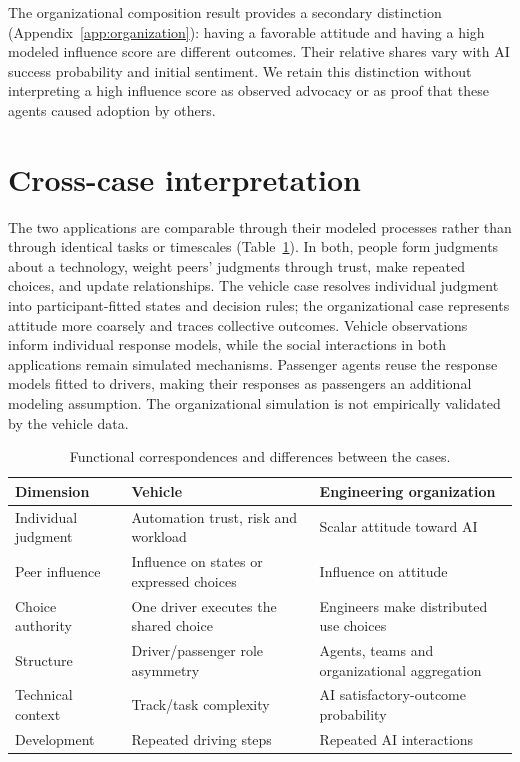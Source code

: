 \documentclass[11pt]{article}
\begin{document}
The organizational composition result provides a secondary distinction
(Appendix~\ref{app:organization}): having a favorable attitude and having a
high modeled influence score are different outcomes. Their relative shares
vary with AI success probability and initial sentiment. We retain this
distinction without interpreting a high influence score as observed advocacy
or as proof that these agents caused adoption by others.
\FloatBarrier

\section{Cross-case interpretation}
\label{sec:interpretation}

The two applications are comparable through their modeled processes rather
than through identical tasks or timescales (Table~\ref{tab:comparison}). In
both, people form judgments about a technology, weight peers' judgments through
trust, make repeated choices, and update relationships. The vehicle case
resolves individual judgment into participant-fitted states and decision
rules; the organizational case represents attitude more coarsely and traces
collective outcomes. Vehicle observations inform individual response models,
while the social interactions in both applications remain simulated mechanisms.
Passenger agents reuse the response models fitted to drivers, making their
responses as passengers an additional modeling assumption.
The organizational simulation is not empirically validated by the vehicle data.

\begin{table}[htbp]
  \centering
  \small
  \caption{Functional correspondences and differences between the cases.}
  \label{tab:comparison}
  \begin{tabularx}{\linewidth}{@{}lXX@{}}
    \toprule
    Dimension & Vehicle & Engineering organization \\
    \midrule
    Individual judgment & Automation trust, risk and workload & Scalar attitude toward AI \\
    Peer influence & Influence on states or expressed choices & Influence on attitude \\
    Choice authority & One driver executes the shared choice & Engineers make distributed use choices \\
    Structure & Driver/passenger role asymmetry & Agents, teams and organizational aggregation \\
    Technical context & Track/task complexity & AI satisfactory-outcome probability \\
    Development & Repeated driving steps & Repeated AI interactions \\
    \bottomrule
  \end{tabularx}
\end{table}
\end{document}
